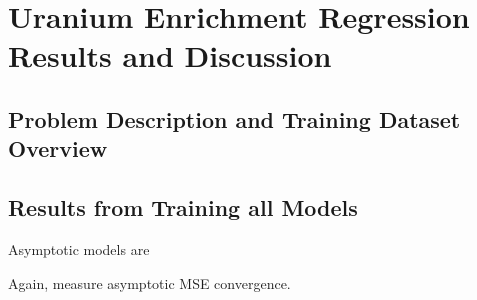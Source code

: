 \chapter{Uranium Enrichment Regression Results and Discussion}

\section{Problem Description and Training Dataset Overview}



\section{Results from Training all Models}


Asymptotic models are 


Again, measure asymptotic MSE convergence.